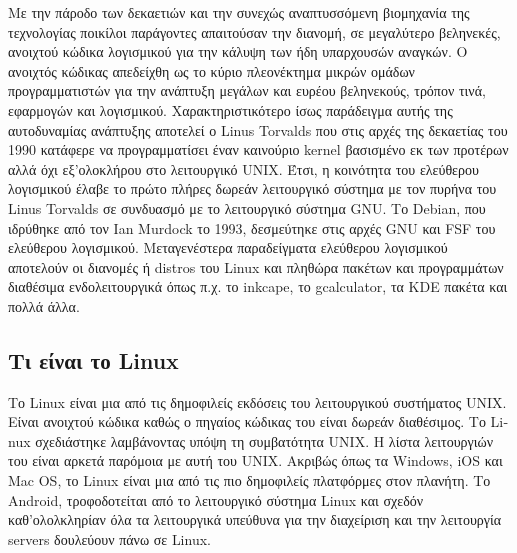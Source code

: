 \documentclass[a4paper, 11pt]{article}
\begin{document}
{Με την πάροδο των δεκαετιών και την συνεχώς αναπτυσσόμενη βιομηχανία της τεχνολογίας ποικίλοι παράγοντες απαιτούσαν την διανομή, σε μεγαλύτερο βεληνεκές, ανοιχτού κώδικα λογισμικού για την κάλυψη των ήδη υπαρχουσών αναγκών. O ανοιχτός κώδικας απεδείχθη ως 
το κύριο πλεονέκτημα μικρών ομάδων προγραμματιστών για την ανάπτυξη μεγάλων και ευρέου βεληνεκούς, τρόπον τινά, εφαρμογών και λογισμικού. Χαρακτηριστικότερο ίσως παράδειγμα αυτής της αυτοδυναμίας ανάπτυξης αποτελεί ο \textlatin{Linus Torvalds} που 
στις αρχές της δεκαετίας του 1990 κατάφερε να προγραμματίσει έναν καινούριο \textlatin{kernel} βασισμένο εκ των προτέρων αλλά όχι εξ'ολοκλήρου στο λειτουργικό 
\textlatin{UNIX}. Έτσι, η κοινότητα του ελεύθερου λογισμικού έλαβε το πρώτο πλήρες δωρεάν λειτουργικό σύστημα με τον πυρήνα του \textlatin{Linus Torvalds} σε συνδυασμό με το λειτουργικό σύστημα \textlatin{GNU}. Το \textlatin{Debian}, που ιδρύθηκε από τον \textlatin{Ian Murdock} το 1993, δεσμεύτηκε στις αρχές \textlatin{GNU} και \textlatin{FSF} του ελεύθερου λογισμικού. Μεταγενέστερα παραδείγματα ελεύθερου λογισμικού αποτελούν οι διανομές ή \textlatin{distros} του \textlatin{Linux} και πληθώρα πακέτων και προγραμμάτων διαθέσιμα ενδολειτουργικά όπως π.χ. το \textlatin{inkcape}, το \textlatin{gcalculator}, τα \textlatin{KDE} πακέτα και πολλά άλλα.

\subsection{Τι είναι το  \textlatin{Linux}}


Το \textlatin{Linux} είναι μια από τις δημοφιλείς εκδόσεις του λειτουργικού συστήματος \textlatin{UNIX}. Είναι ανοιχτού κώδικα καθώς ο πηγαίος κώδικας του είναι δωρεάν διαθέσιμος. Το \textlatin{Linux} σχεδιάστηκε λαμβάνοντας υπόψη τη συμβατότητα \textlatin{UNIX}. Η λίστα λειτουργιών του είναι αρκετά παρόμοια με αυτή του \textlatin{UNIX}. Ακριβώς όπως τα \textlatin{Windows}, \textlatin{iOS} και \textlatin{Mac OS}, το \textlatin{Linux} είναι μια από τις πιο δημοφιλείς πλατφόρμες στον πλανήτη. Το \textlatin{Android}, τροφοδοτείται από το λειτουργικό σύστημα \textlatin{Linux} και σχεδόν καθ'ολολκληρίαν όλα τα λειτουργικά υπεύθυνα για την διαχείριση και την λειτουργία \textlatin{servers} δουλεύουν πάνω σε \textlatin{Linux}. 

}
\end{document}
